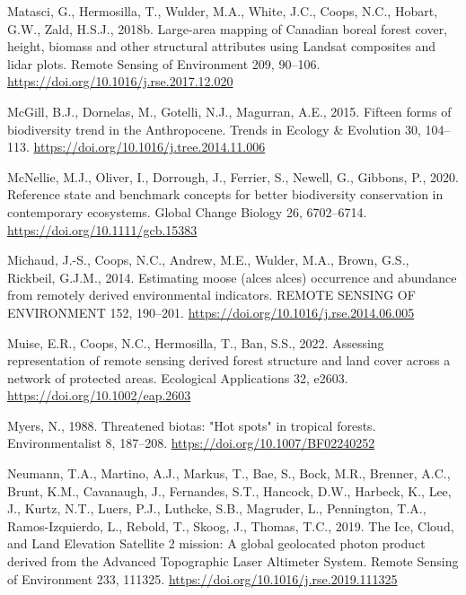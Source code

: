 \documentclass[
]{agujournal2019}
\newlength{\cslhangindent}
\newenvironment{CSLReferences}[2] %
 {\begin{list}{}{%
  \setlength{\itemindent}{0pt}
  \setlength{\leftmargin}{0pt}
  \setlength{\parsep}{0pt}
  \ifodd #1
   \setlength{\leftmargin}{\cslhangindent}
   \setlength{\itemindent}{-1\cslhangindent}
  \fi
  \setlength{\itemsep}{#2\baselineskip}}}
 {\end{list}}
\begin{document}
\begin{CSLReferences}{1}{0}
Matasci, G., Hermosilla, T., Wulder, M.A., White, J.C., Coops, N.C.,
Hobart, G.W., Zald, H.S.J., 2018b. Large-area mapping of Canadian boreal
forest cover, height, biomass and other structural attributes using
Landsat composites and lidar plots. Remote Sensing of Environment 209,
90--106. \url{https://doi.org/10.1016/j.rse.2017.12.020}

McGill, B.J., Dornelas, M., Gotelli, N.J., Magurran, A.E., 2015. Fifteen
forms of biodiversity trend in the Anthropocene. Trends in Ecology \&
Evolution 30, 104--113. \url{https://doi.org/10.1016/j.tree.2014.11.006}

McNellie, M.J., Oliver, I., Dorrough, J., Ferrier, S., Newell, G.,
Gibbons, P., 2020. Reference state and benchmark concepts for better
biodiversity conservation in contemporary ecosystems. Global Change
Biology 26, 6702--6714. \url{https://doi.org/10.1111/gcb.15383}

Michaud, J.-S., Coops, N.C., Andrew, M.E., Wulder, M.A., Brown, G.S.,
Rickbeil, G.J.M., 2014. Estimating moose (alces alces) occurrence and
abundance from remotely derived environmental indicators. REMOTE SENSING
OF ENVIRONMENT 152, 190--201.
\url{https://doi.org/10.1016/j.rse.2014.06.005}

Muise, E.R., Coops, N.C., Hermosilla, T., Ban, S.S., 2022. Assessing
representation of remote sensing derived forest structure and land cover
across a network of protected areas. Ecological Applications 32, e2603.
\url{https://doi.org/10.1002/eap.2603}

Myers, N., 1988. Threatened biotas: {"}Hot spots{"} in tropical forests.
Environmentalist 8, 187--208. \url{https://doi.org/10.1007/BF02240252}

Neumann, T.A., Martino, A.J., Markus, T., Bae, S., Bock, M.R., Brenner,
A.C., Brunt, K.M., Cavanaugh, J., Fernandes, S.T., Hancock, D.W.,
Harbeck, K., Lee, J., Kurtz, N.T., Luers, P.J., Luthcke, S.B., Magruder,
L., Pennington, T.A., Ramos-Izquierdo, L., Rebold, T., Skoog, J.,
Thomas, T.C., 2019. The Ice, Cloud, and Land Elevation Satellite
{\textendash} 2 mission: A global geolocated photon product derived from
the Advanced Topographic Laser Altimeter System. Remote Sensing of
Environment 233, 111325. \url{https://doi.org/10.1016/j.rse.2019.111325}


\end{CSLReferences}
\end{document}
